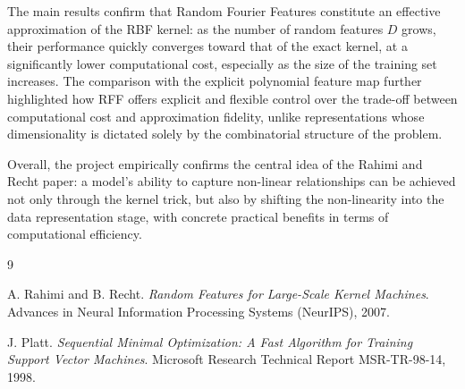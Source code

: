 \documentclass{article}
\begin{document}
The main results confirm that Random Fourier Features constitute an effective approximation of the RBF kernel: as the number of random features $D$ grows, their performance quickly converges toward that of the exact kernel, at a significantly lower computational cost, especially as the size of the training set increases. The comparison with the explicit polynomial feature map further highlighted how RFF offers explicit and flexible control over the trade-off between computational cost and approximation fidelity, unlike representations whose dimensionality is dictated solely by the combinatorial structure of the problem.

Overall, the project empirically confirms the central idea of the Rahimi and Recht paper: a model's ability to capture non-linear relationships can be achieved not only through the kernel trick, but also by shifting the non-linearity into the data representation stage, with concrete practical benefits in terms of computational efficiency.

\begin{thebibliography}{9}

A. Rahimi and B. Recht.
\textit{Random Features for Large-Scale Kernel Machines}.
Advances in Neural Information Processing Systems (NeurIPS), 2007.

J. Platt.
\textit{Sequential Minimal Optimization: A Fast Algorithm for Training Support Vector Machines}.
Microsoft Research Technical Report MSR-TR-98-14, 1998.

\end{thebibliography}
\end{document}
